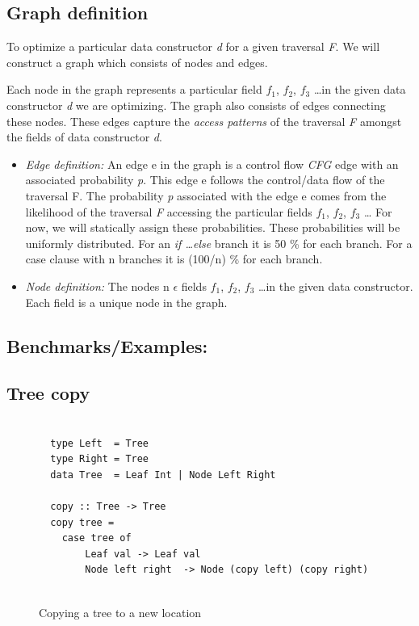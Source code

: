 \subsection{Graph definition}

To optimize a particular data constructor \textit{d} for a given traversal \textit{F}. 
We will construct a graph which consists of nodes and edges.

Each node in the graph represents a particular field $f_1$, $f_2$, $f_3$ \dots in the given data constructor \textit{d} we are optimizing. 
The graph also consists of edges connecting these nodes. These edges capture the \textit{access patterns} of the 
traversal \textit{F} amongst the fields of data constructor \textit{d}.

\begin{itemize}
\item \textit{Edge definition:} An edge e in the graph is a control flow \textit{CFG} edge with an associated probability \textit{p}.
                                This edge e follows the control/data flow of the traversal {F}.
                                The probability \textit{p} associated with the edge e comes from the likelihood of the traversal \textit{F}
                                accessing the particular fields $f_1$, $f_2$, $f_3$ \dots 
                                For now, we will statically assign these probabilities. These probabilities will be uniformly distributed. 
                                For an \textit{if \dots else} branch it is 50 \% for each branch. 
                                For a case clause with n branches it is (100/n) \% for each branch. 

\item \textit{Node definition:} The nodes n $\epsilon$ fields $f_1$, $f_2$, $f_3$ \dots in the given data constructor. 
                                Each field is a unique node in the graph.

\end{itemize}


\subsection{Benchmarks/Examples: }

\subsection{Tree copy}

\begin{figure}[H]
  \begin{lstlisting}[]

  type Left  = Tree
  type Right = Tree
  data Tree  = Leaf Int | Node Left Right

  copy :: Tree -> Tree 
  copy tree = 
    case tree of 
        Leaf val -> Leaf val 
        Node left right  -> Node (copy left) (copy right)
  
  \end{lstlisting}
  \caption{Copying a tree to a new location}
  \label{fig:tree-copy}
\end{figure}


